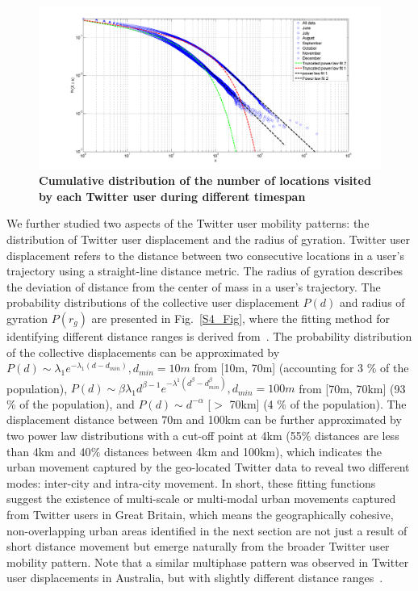 \documentclass[]{tGIS2e}
\begin{document}
{\begin{figure}[ht]
\includegraphics[width=1.0\linewidth]{./figure/S3_visitation}
\caption{ \bfseries{Cumulative distribution of the number of locations visited by each Twitter user during different timespan}}
\label{S3_Fig}
\end{figure}

We further studied two aspects of the Twitter user mobility patterns: the distribution of Twitter user displacement and the radius of gyration. 
Twitter user displacement refers to the distance between two consecutive locations in a user's trajectory using a straight-line distance metric.
The radius of gyration describes the deviation of distance from the center of mass in a user's trajectory.
The probability distributions of the collective user displacement $P(d)$ and radius of gyration $P(r_g)$ are presented in Fig.~\ref{S4_Fig}, where the fitting method for identifying different distance ranges is derived from~\citep{jurdak2015}.
The probability distribution of the collective displacements can be approximated by $P(d) \sim \lambda_{1} e^{-\lambda_{1}(d - d_{min})}, d_{min}=10m$ from [10m, 70m] (accounting for 3 $\%$ of the population),  $ P(d) \sim \beta\lambda_{1}d^{\beta-1}e^{-\lambda^{1}(d^\beta-d_{min}^\beta)}, d_{min} = 100m$ from [70m, 70km] (93 $\%$ of the population), and $P(d) \sim {d}^{-\alpha}$ [$>$ 70km] (4 $\%$ of the population). 
The displacement distance between 70m and 100km can be further approximated by two power law distributions with a cut-off point at 4km (55$\%$ distances are less than 4km and 40$\%$ distances between 4km and 100km), which indicates the urban movement captured by the geo-located Twitter data to reveal two different modes: inter-city and intra-city movement. 
In short, these fitting functions suggest the existence of multi-scale or multi-modal urban movements captured from Twitter users in Great Britain, which means the geographically cohesive, non-overlapping urban areas identified in the next section are not just a result of short distance movement but emerge naturally from the broader Twitter user mobility pattern.
Note that a similar multiphase pattern was observed in Twitter user displacements in Australia, but with slightly different distance ranges~\citep{jurdak2015}.

}
\end{document}
